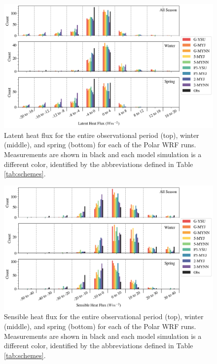 \begin{figure}[h]
    \centering
    \includegraphics[width=1\linewidth]{figures/chapter3/WRF_LHF_Histo.png}
    \caption[Polar WRF simulated latent heat flux histograms.]{Latent heat flux for the entire observational period (top), winter (middle), and spring (bottom) for each of the Polar WRF runs. Measurements are shown in black and each model simulation is a different color, identified by the abbreviations defined in Table \ref{tab:schemes}.}
    \label{fig:wrf_hlf}
\end{figure}

\begin{figure}[h]
    \centering
    \includegraphics[width=1\linewidth]{figures/chapter3/WRF_SHF_Histo.png}
    \caption[Polar WRF simulated sensible heat flux histograms.]{Sensible heat flux for the entire observational period (top), winter (middle), and spring (bottom) for each of the Polar WRF runs. Measurements are shown in black and each model simulation is a different color, identified by the abbreviations defined in Table \ref{tab:schemes}.}
    \label{fig:wrf_shf}
\end{figure}

